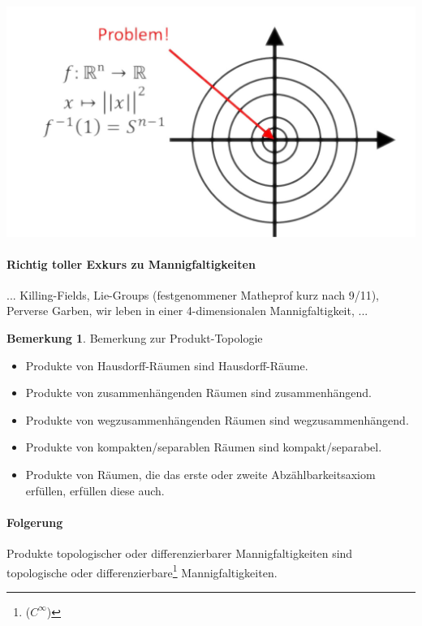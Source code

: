 \documentclass[a4paper,11pt,notitlepage]{report}
\theoremstyle{definition}
\newtheorem{remark}{Bemerkung}[chapter]
\begin{document}
\includegraphics[scale=0.4]{images/Norm_invers.png}


\paragraph{Richtig toller Exkurs zu Mannigfaltigkeiten}... Killing-Fields, Lie-Groups (festgenommener Matheprof kurz nach 9/11), Perverse Garben, wir leben in einer 4-dimensionalen Mannigfaltigkeit, ...

\newpage
\begin{remark}{Bemerkung zur Produkt-Topologie}
\begin{itemize}
	\item Produkte von Hausdorff-Räumen sind Hausdorff-Räume.
	\item Produkte von zusammenhängenden Räumen sind zusammenhängend.
	\item Produkte von wegzusammenhängenden Räumen sind wegzusammenhängend.
	\item Produkte von kompakten/separablen Räumen sind kompakt/separabel.
	\item Produkte von Räumen, die das erste oder zweite Abzählbarkeitsaxiom erfüllen, erfüllen diese auch.
\end{itemize}
 
\paragraph{Folgerung}
	Produkte topologischer oder differenzierbarer Mannigfaltigkeiten sind topologische oder differenzierbare\footnote{($C^\infty$)} Mannigfaltigkeiten.
\end{remark}
 
\end{document}
